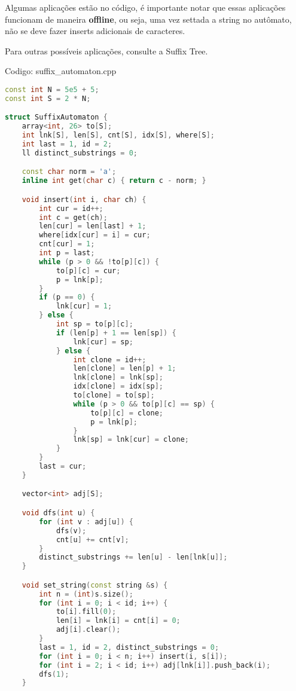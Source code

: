 \documentclass[10pt, a4paper, oneside]{book}
\begin{document}
Algumas aplicações estão no código, é importante notar que essas aplicações funcionam de maneira \textbf{offline}, ou seja, uma vez settada a string no autômato, não se deve fazer inserts adicionais de caracteres.



Para outras possíveis aplicações, consulte a Suffix Tree.
\hfill

Codigo: suffix\_automaton.cpp

\begin{lstlisting}[language=C++]
const int N = 5e5 + 5;
const int S = 2 * N;

struct SuffixAutomaton {
    array<int, 26> to[S];
    int lnk[S], len[S], cnt[S], idx[S], where[S];
    int last = 1, id = 2;
    ll distinct_substrings = 0;

    const char norm = 'a';
    inline int get(char c) { return c - norm; }

    void insert(int i, char ch) {
        int cur = id++;
        int c = get(ch);
        len[cur] = len[last] + 1;
        where[idx[cur] = i] = cur;
        cnt[cur] = 1;
        int p = last;
        while (p > 0 && !to[p][c]) {
            to[p][c] = cur;
            p = lnk[p];
        }
        if (p == 0) {
            lnk[cur] = 1;
        } else {
            int sp = to[p][c];
            if (len[p] + 1 == len[sp]) {
                lnk[cur] = sp;
            } else {
                int clone = id++;
                len[clone] = len[p] + 1;
                lnk[clone] = lnk[sp];
                idx[clone] = idx[sp];
                to[clone] = to[sp];
                while (p > 0 && to[p][c] == sp) {
                    to[p][c] = clone;
                    p = lnk[p];
                }
                lnk[sp] = lnk[cur] = clone;
            }
        }
        last = cur;
    }

    vector<int> adj[S];

    void dfs(int u) {
        for (int v : adj[u]) {
            dfs(v);
            cnt[u] += cnt[v];
        }
        distinct_substrings += len[u] - len[lnk[u]];
    }

    void set_string(const string &s) {
        int n = (int)s.size();
        for (int i = 0; i < id; i++) {
            to[i].fill(0);
            len[i] = lnk[i] = cnt[i] = 0;
            adj[i].clear();
        }
        last = 1, id = 2, distinct_substrings = 0;
        for (int i = 0; i < n; i++) insert(i, s[i]);
        for (int i = 2; i < id; i++) adj[lnk[i]].push_back(i);
        dfs(1);
    }


\end{lstlisting}
\end{document}
